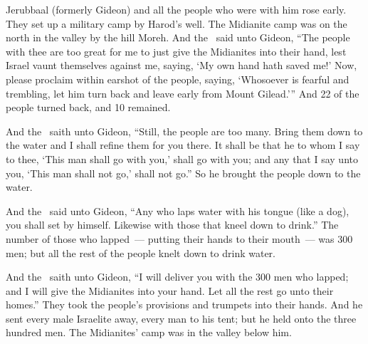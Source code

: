 
\begin{inparaenum}
   Jerubbaal (formerly Gideon) and all the people who were with him rose early. They set up a military camp by Harod's well. The Midianite camp was on the north in the valley by the hill Moreh.%
   And the \lord\ said unto Gideon, ``The people with thee are too great for me to just give the Midianites into their hand, lest Israel vaunt themselves against me, saying, `My own hand hath saved me!'%
   Now, please proclaim within earshot of the people, saying, `Whosoever is fearful and trembling, let him turn back and leave early from Mount Gilead.'\thinspace'' And 22 of the people turned back, and 10 remained.%
  
   And the \lord\ saith unto Gideon, ``Still, the people are too many. Bring them down to the water and I shall refine them for you there. It shall be that he to whom I say to thee, `This man shall go with you,' shall go with you; and any that I say unto you, `This man shall not go,' shall not go.''%
   So he brought the people down to the water.%
  
  And the \lord\ said unto Gideon, ``Any who laps water with his tongue (like a dog), you shall set by himself. Likewise with those that kneel down to drink.''%
   The number of those who lapped~--- putting their hands to their mouth~--- was 300 men; but all the rest of the people knelt down to drink water.%
  
   And the \lord\ saith unto Gideon, ``I will deliver you with the 300 men who lapped; and I will give the Midianites into your hand. Let all the rest go unto their homes.''%
   They took the people's provisions and trumpets into their hands. And he sent every male Israelite away, every man to his tent; but he held onto the three hundred men. The Midianites' camp was in the valley below him.%
  

\end{inparaenum}
